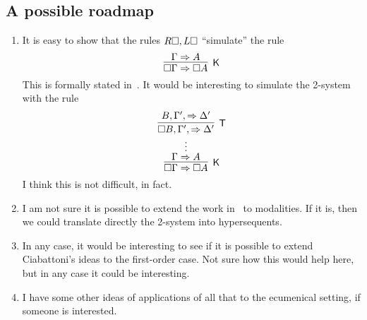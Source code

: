 \subsection{A possible roadmap}
\begin{enumerate}
\item It is easy to show that the rules $R\square,L\square$ ``simulate'' the rule 
\[
\infer[\K]{\Box\Gamma\seq\Box A}{\Gamma\seq A}
\]
This is formally stated in~\cite{DBLP:conf/tableaux/PimentelRL19}. It would be interesting to simulate the 2-system
with the rule
\[
\infer[\K]{\Box\Gamma\seq\Box A}
{\deduce{\Gamma\seq A}
{\deduce{\vdots}
{\infer[\T]{\Box B,\Gamma',\seq\Delta'}{B,\Gamma',\seq\Delta'}}}}
\]
I think this is not difficult, in fact.
\item I am not sure it is possible to extend the work in~\cite{DBLP:journals/tocl/CiabattoniG18} to modalities. If it is, then we could translate directly the 2-system into hypersequents.
\item  In any case, it would be interesting to see if it is possible to extend Ciabattoni's ideas to the first-order case. Not sure how this would help here, but in any case it could be interesting.
\item  I have some other ideas of applications of all that to the ecumenical setting, if someone is interested.
\end{enumerate}
